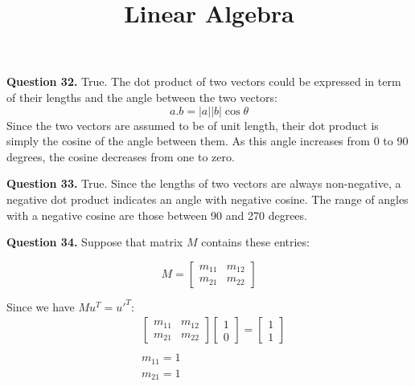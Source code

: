 \documentclass{ximera}
\title{Linear Algebra}
\begin{document}
\maketitle

\textbf{Question 32.} True. The dot product of two vectors could be expressed in term of their lengths and the angle between the two vectors:
\begin{equation*}
a . b = |a| |b| \cos \theta
\end{equation*}
Since the two vectors are assumed to be of unit length, their dot product is simply the cosine of the angle between them. As this angle increases from 0 to 90 degrees, the cosine decreases from one to zero. 

\textbf{Question 33.} True. Since the lengths of two vectors are always non-negative, a negative dot product indicates an angle with negative cosine. The range of angles with a negative cosine are those between 90 and 270 degrees.

\textbf{Question 34.} Suppose that matrix $M$ contains these entries:
\begin{center}
\begin{equation*}
M =
\begin{bmatrix}
m_{11} & m_{12} \\
m_{21} & m_{22}
\end{bmatrix}
\end{equation*}
\end{center}

Since we have $M u^T = u'^T$:
\begin{align*}
&\begin{bmatrix}
m_{11} & m_{12} \\
m_{21} & m_{22}
\end{bmatrix}
\begin{bmatrix}
1 \\
0
\end{bmatrix}
= 
\begin{bmatrix}
1 \\
1
\end{bmatrix} \\
\\
& m_{11} = 1 \\
& m_{21} = 1
\end{align*}
\end{document}
